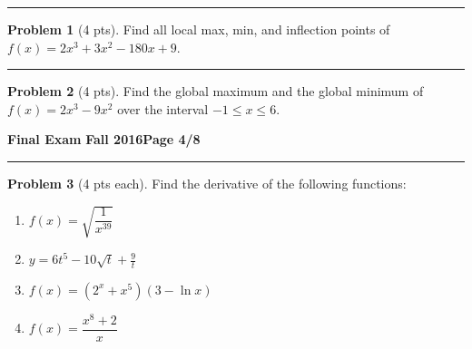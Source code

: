 \documentclass[12pt]{article}
\theoremstyle{definition}
\newtheorem{problem}{Problem}
\begin{document}
\hrule
\begin{problem}[4 pts]
Find all local max, min, and inflection points of $f(x) = 2x^3 + 3x^2-180x+9$.
\end{problem}
\vspace{6cm}
\hrule
\begin{problem}[4 pts]
Find the global maximum and the global minimum of $f(x) = 2x^3 - 9x^2$ over the interval $-1 \leq x \leq 6$.
\end{problem}

\newpage

\hfill{\large\bf Final Exam}\hfill{\large\bf
  Fall 2016}\hfill{\large\bf Page 4/8}\hrule

\bigskip

\bigskip
\begin{problem}[4 pts each]
Find the derivative of the following functions:
\begin{enumerate}
\item $f(x) = \sqrt{\dfrac{1}{x^{39}}}$
\begin{flushright}
\end{flushright}
\item $y = 6t^5 - 10\sqrt{t} + \frac{9}{t}$
\begin{flushright}
\end{flushright}
\item $f(x) = (2^x + x^5)(3 - \ln x)$
\begin{flushright}
\end{flushright}
\item $f(x) = \dfrac{x^8+2}{x}$
\begin{flushright}
\end{flushright}

\end{enumerate}
\end{problem}
\end{document}
